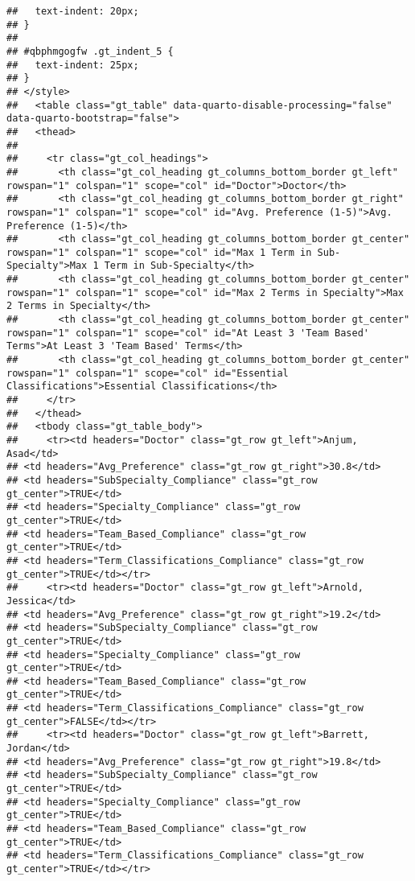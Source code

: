 \documentclass[
]{article}
\begin{document}
\begin{verbatim}
##   text-indent: 20px;
## }
## 
## #qbphmgogfw .gt_indent_5 {
##   text-indent: 25px;
## }
## </style>
##   <table class="gt_table" data-quarto-disable-processing="false" data-quarto-bootstrap="false">
##   <thead>
##     
##     <tr class="gt_col_headings">
##       <th class="gt_col_heading gt_columns_bottom_border gt_left" rowspan="1" colspan="1" scope="col" id="Doctor">Doctor</th>
##       <th class="gt_col_heading gt_columns_bottom_border gt_right" rowspan="1" colspan="1" scope="col" id="Avg. Preference (1-5)">Avg. Preference (1-5)</th>
##       <th class="gt_col_heading gt_columns_bottom_border gt_center" rowspan="1" colspan="1" scope="col" id="Max 1 Term in Sub-Specialty">Max 1 Term in Sub-Specialty</th>
##       <th class="gt_col_heading gt_columns_bottom_border gt_center" rowspan="1" colspan="1" scope="col" id="Max 2 Terms in Specialty">Max 2 Terms in Specialty</th>
##       <th class="gt_col_heading gt_columns_bottom_border gt_center" rowspan="1" colspan="1" scope="col" id="At Least 3 'Team Based' Terms">At Least 3 'Team Based' Terms</th>
##       <th class="gt_col_heading gt_columns_bottom_border gt_center" rowspan="1" colspan="1" scope="col" id="Essential Classifications">Essential Classifications</th>
##     </tr>
##   </thead>
##   <tbody class="gt_table_body">
##     <tr><td headers="Doctor" class="gt_row gt_left">Anjum, Asad</td>
## <td headers="Avg_Preference" class="gt_row gt_right">30.8</td>
## <td headers="SubSpecialty_Compliance" class="gt_row gt_center">TRUE</td>
## <td headers="Specialty_Compliance" class="gt_row gt_center">TRUE</td>
## <td headers="Team_Based_Compliance" class="gt_row gt_center">TRUE</td>
## <td headers="Term_Classifications_Compliance" class="gt_row gt_center">TRUE</td></tr>
##     <tr><td headers="Doctor" class="gt_row gt_left">Arnold, Jessica</td>
## <td headers="Avg_Preference" class="gt_row gt_right">19.2</td>
## <td headers="SubSpecialty_Compliance" class="gt_row gt_center">TRUE</td>
## <td headers="Specialty_Compliance" class="gt_row gt_center">TRUE</td>
## <td headers="Team_Based_Compliance" class="gt_row gt_center">TRUE</td>
## <td headers="Term_Classifications_Compliance" class="gt_row gt_center">FALSE</td></tr>
##     <tr><td headers="Doctor" class="gt_row gt_left">Barrett, Jordan</td>
## <td headers="Avg_Preference" class="gt_row gt_right">19.8</td>
## <td headers="SubSpecialty_Compliance" class="gt_row gt_center">TRUE</td>
## <td headers="Specialty_Compliance" class="gt_row gt_center">TRUE</td>
## <td headers="Team_Based_Compliance" class="gt_row gt_center">TRUE</td>
## <td headers="Term_Classifications_Compliance" class="gt_row gt_center">TRUE</td></tr>

\end{verbatim}
\end{document}
